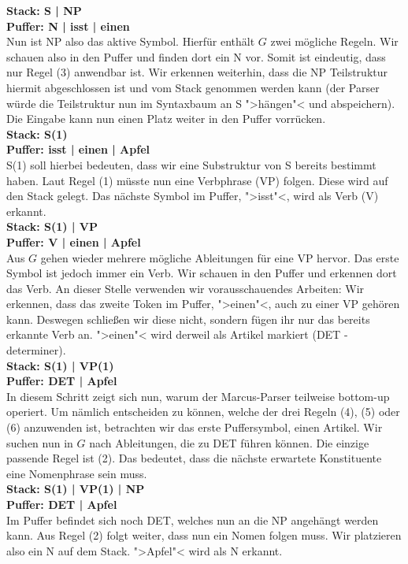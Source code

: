 \documentclass[12pt,a4paper]{article}
\theoremstyle{definition}
\begin{document}
		\textbf{Stack: S | NP\\
				Puffer: N | isst | einen\\
		}
		Nun ist NP also das aktive Symbol. Hierfür enthält $G$ zwei mögliche Regeln. Wir schauen also in den Puffer und finden dort ein N vor. Somit ist eindeutig, dass nur Regel (3) anwendbar ist. Wir erkennen weiterhin, dass die NP Teilstruktur hiermit abgeschlossen ist und vom Stack genommen werden kann (der Parser würde die Teilstruktur nun im Syntaxbaum an S ">hängen"< und abspeichern). Die Eingabe kann nun einen Platz weiter in den Puffer vorrücken.\\
		
		\textbf{Stack: S(1)\\
				Puffer: isst | einen | Apfel\\
		}
		S(1) soll hierbei bedeuten, dass wir eine Substruktur von S bereits bestimmt haben. Laut Regel (1) müsste nun eine Verbphrase (VP) folgen. Diese wird auf den Stack gelegt. Das nächste Symbol im Puffer, ">isst"<, wird als Verb (V) erkannt.\\
		
		\textbf{Stack: S(1) | VP\\
				Puffer: V | einen | Apfel\\
		}
		Aus $G$ gehen wieder mehrere mögliche Ableitungen für eine VP hervor. Das erste Symbol ist jedoch immer ein Verb. Wir schauen in den Puffer und erkennen dort das Verb. An dieser Stelle verwenden wir vorausschauendes Arbeiten: Wir erkennen, dass das zweite Token im Puffer, ">einen"<, auch zu einer VP gehören kann. Deswegen schließen wir diese nicht, sondern fügen ihr nur das bereits erkannte Verb an. ">einen"< wird derweil als Artikel markiert (DET - determiner).\\
		
		\textbf{Stack: S(1) | VP(1)\\
				Puffer: DET | Apfel\\
		}
		In diesem Schritt zeigt sich nun, warum der Marcus-Parser teilweise bottom-up operiert. Um nämlich entscheiden zu können, welche der drei Regeln (4), (5) oder (6) anzuwenden ist, betrachten wir das erste Puffersymbol, einen Artikel. Wir suchen nun in $G$ nach Ableitungen, die zu DET führen können.
		Die einzige passende Regel ist (2). Das bedeutet, dass die nächste erwartete Konstituente eine Nomenphrase sein muss.\\
		
		\textbf{Stack: S(1) | VP(1) | NP\\
				Puffer: DET | Apfel\\
		}
		Im Puffer befindet sich noch DET, welches nun  an die NP angehängt werden kann. Aus Regel (2) folgt weiter, dass nun ein Nomen folgen muss. Wir platzieren also ein N auf dem Stack. ">Apfel"< wird als N erkannt.\\
		
\end{document}
